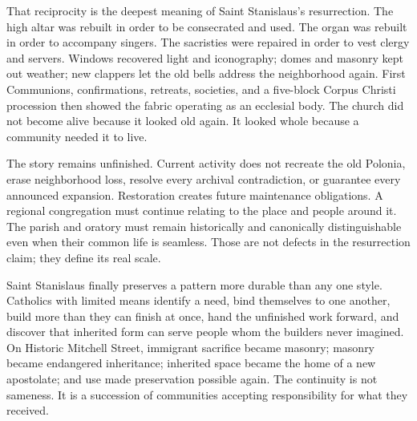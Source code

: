 That reciprocity is the deepest meaning of Saint Stanislaus's resurrection. The high altar was rebuilt in order to be consecrated and used. The organ was rebuilt in order to accompany singers. The sacristies were repaired in order to vest clergy and servers. Windows recovered light and iconography; domes and masonry kept out weather; new clappers let the old bells address the neighborhood again. First Communions, confirmations, retreats, societies, and a five-block Corpus Christi procession then showed the fabric operating as an ecclesial body. The church did not become alive because it looked old again. It looked whole because a community needed it to live.

The story remains unfinished. Current activity does not recreate the old Polonia, erase neighborhood loss, resolve every archival contradiction, or guarantee every announced expansion. Restoration creates future maintenance obligations. A regional congregation must continue relating to the place and people around it. The parish and oratory must remain historically and canonically distinguishable even when their common life is seamless. Those are not defects in the resurrection claim; they define its real scale.

Saint Stanislaus finally preserves a pattern more durable than any one style. Catholics with limited means identify a need, bind themselves to one another, build more than they can finish at once, hand the unfinished work forward, and discover that inherited form can serve people whom the builders never imagined. On Historic Mitchell Street, immigrant sacrifice became masonry; masonry became endangered inheritance; inherited space became the home of a new apostolate; and use made preservation possible again. The continuity is not sameness. It is a succession of communities accepting responsibility for what they received.

